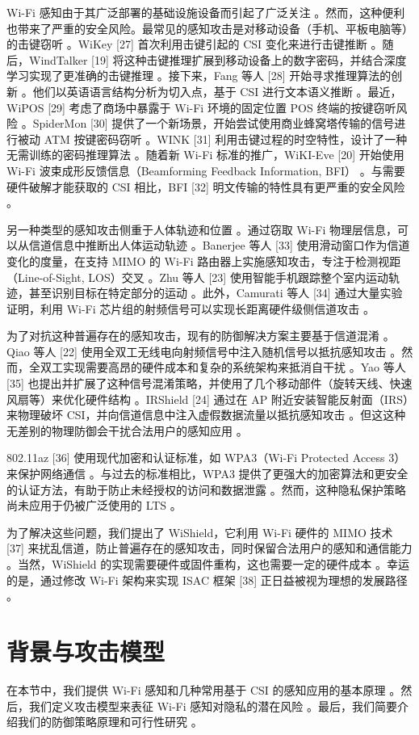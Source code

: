 \documentclass[journal]{IEEEtran}
\begin{document}
Wi-Fi 感知由于其广泛部署的基础设施设备而引起了广泛关注 。然而，这种便利也带来了严重的安全风险。最常见的感知攻击是对移动设备（手机、平板电脑等）的击键窃听 。WiKey [27] 首次利用击键引起的 CSI 变化来进行击键推断 。随后，WindTalker [19] 将这种击键推理扩展到移动设备上的数字密码，并结合深度学习实现了更准确的击键推理 。接下来，Fang 等人 [28] 开始寻求推理算法的创新 。他们以英语语言结构分析为切入点，基于 CSI 进行文本语义推断 。最近，WiPOS [29] 考虑了商场中暴露于 Wi-Fi 环境的固定位置 POS 终端的按键窃听风险 。SpiderMon [30] 提供了一个新场景，开始尝试使用商业蜂窝塔传输的信号进行被动 ATM 按键密码窃听 。WINK [31] 利用击键过程的时空特性，设计了一种无需训练的密码推理算法 。随着新 Wi-Fi 标准的推广，WiKI-Eve [20] 开始使用 Wi-Fi 波束成形反馈信息（Beamforming Feedback Information, BFI） 。与需要硬件破解才能获取的 CSI 相比，BFI [32] 明文传输的特性具有更严重的安全风险 。

另一种类型的感知攻击侧重于人体轨迹和位置 。通过窃取 Wi-Fi 物理层信息，可以从信道信息中推断出人体运动轨迹 。Banerjee 等人 [33] 使用滑动窗口作为信道变化的度量，在支持 MIMO 的 Wi-Fi 路由器上实施感知攻击，专注于检测视距（Line-of-Sight, LOS）交叉 。Zhu 等人 [23] 使用智能手机跟踪整个室内运动轨迹，甚至识别目标在特定部分的运动 。此外，Camurati 等人 [34] 通过大量实验证明，利用 Wi-Fi 芯片组的射频信号可以实现长距离硬件级侧信道攻击 。

为了对抗这种普遍存在的感知攻击，现有的防御解决方案主要基于信道混淆 。Qiao 等人 [22] 使用全双工无线电向射频信号中注入随机信号以抵抗感知攻击 。然而，全双工实现需要高昂的硬件成本和复杂的系统架构来抵消自干扰 。Yao 等人 [35] 也提出并扩展了这种信号混淆策略，并使用了几个移动部件（旋转天线、快速风扇等）来优化硬件结构 。IRShield [24] 通过在 AP 附近安装智能反射面（IRS）来物理破坏 CSI，并向信道信息中注入虚假数据流量以抵抗感知攻击 。但这这种无差别的物理防御会干扰合法用户的感知应用 。

802.11az [36] 使用现代加密和认证标准，如 WPA3（Wi-Fi Protected Access 3）来保护网络通信 。与过去的标准相比，WPA3 提供了更强大的加密算法和更安全的认证方法，有助于防止未经授权的访问和数据泄露 。然而，这种隐私保护策略尚未应用于仍被广泛使用的 LTS 。

为了解决这些问题，我们提出了 WiShield，它利用 Wi-Fi 硬件的 MIMO 技术 [37] 来扰乱信道，防止普遍存在的感知攻击，同时保留合法用户的感知和通信能力 。当然，WiShield 的实现需要硬件或固件重构，这也需要一定的硬件成本 。幸运的是，通过修改 Wi-Fi 架构来实现 ISAC 框架 [38] 正日益被视为理想的发展路径 。

\section{背景与攻击模型}
在本节中，我们提供 Wi-Fi 感知和几种常用基于 CSI 的感知应用的基本原理 。然后，我们定义攻击模型来表征 Wi-Fi 感知对隐私的潜在风险 。最后，我们简要介绍我们的防御策略原理和可行性研究 。
\end{document}

